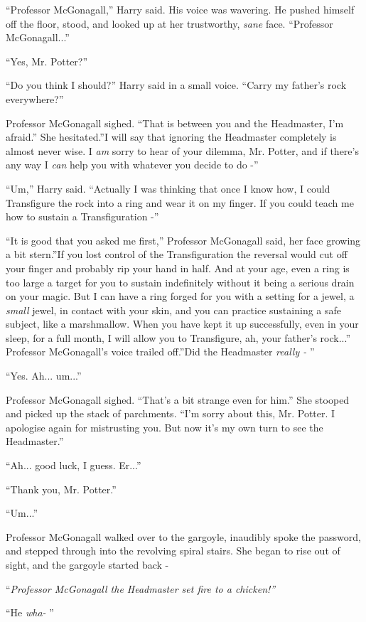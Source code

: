 ``Professor McGonagall,'' Harry said. His voice was wavering. He pushed
himself off the floor, stood, and looked up at her trustworthy,
\emph{sane} face. ``Professor McGonagall...''

``Yes, Mr. Potter?''

``Do you think I should?'' Harry said in a small voice. ``Carry my
father's rock everywhere?''

Professor McGonagall sighed. ``That is between you and the Headmaster,
I'm afraid.'' She hesitated.''I will say that ignoring the Headmaster
completely is almost never wise. I \emph{am} sorry to hear of your
dilemma, Mr. Potter, and if there's any way I \emph{can} help you with
whatever you decide to do -''

``Um,'' Harry said. ``Actually I was thinking that once I know how, I
could Transfigure the rock into a ring and wear it on my finger. If you
could teach me how to sustain a Transfiguration -''

``It is good that you asked me first,'' Professor McGonagall said, her
face growing a bit stern.''If you lost control of the Transfiguration
the reversal would cut off your finger and probably rip your hand in
half. And at your age, even a ring is too large a target for you to
sustain indefinitely without it being a serious drain on your magic. But
I can have a ring forged for you with a setting for a jewel, a
\emph{small} jewel, in contact with your skin, and you can practice
sustaining a safe subject, like a marshmallow. When you have kept it up
successfully, even in your sleep, for a full month, I will allow you to
Transfigure, ah, your father's rock...'' Professor McGonagall's
voice trailed off.''Did the Headmaster \emph{really -} ''

``Yes. Ah... um...''

Professor McGonagall sighed. ``That's a bit strange even for him.'' She
stooped and picked up the stack of parchments. ``I'm sorry about this,
Mr. Potter. I apologise again for mistrusting you. But now it's my own
turn to see the Headmaster.''

``Ah... good luck, I guess. Er...''

``Thank you, Mr. Potter.''

``Um...''

Professor McGonagall walked over to the gargoyle, inaudibly spoke the
password, and stepped through into the revolving spiral stairs. She
began to rise out of sight, and the gargoyle started back -

``\emph{Professor McGonagall the Headmaster set fire to a chicken!''}

``He \emph{wha-} ''
